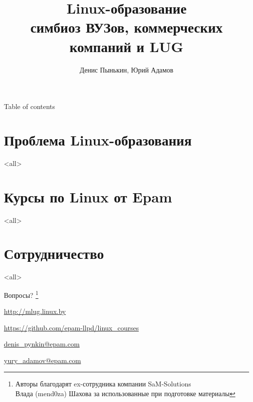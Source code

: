 
\graphicspath{{../lvee2013-winter/clipart/}}
\title{Linux-образование \\ симбиоз ВУЗов, коммерческих компаний и LUG}
\author{Денис Пынькин, Юрий Адамов}



\begin{frame}
	\titlepage
\end{frame}

\begin{frame}{Table of contents}
	\tableofcontents
\end{frame}


\section[Проблема]{Проблема Linux-образования}
\mode<all>{}
\section[Epam]{Курсы по Linux от Epam}
\mode<all>{}
\section{Сотрудничество}
\mode<all>{}

\begin{frame}[fragile]{}

  \Large \alert{Вопросы?}  \footnote{Авторы благодарят ex-сотрудника компании SaM-Solutions \\
  Влада (mend0za) Шахова за использованные при подготовке материалы}

  \bigskip

  \href{http://mlug.linux.by}{http://mlug.linux.by}

  \href{https://github.com/epam-llpd/linux\_courses}{https://github.com/epam-llpd/linux\_courses}

  \hrulefill

  \href{mailto:denis\_pynkin@epam.com}{denis\_pynkin@epam.com}

  \href{mailto:yury\_adamov@epam.com}{yury\_adamov@epam.com}


\end{frame}


